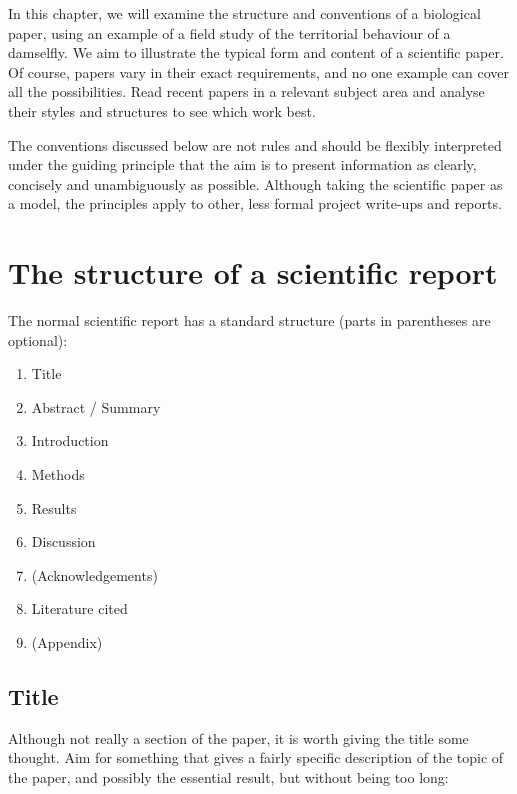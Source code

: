 \documentclass[
]{book}
\providecommand{\tightlist}{%
  \setlength{\itemsep}{0pt}\setlength{\parskip}{0pt}}
\begin{document}
In this chapter, we will examine the structure and conventions of a biological paper, using an example of a field study of the territorial behaviour of a damselfly. We aim to illustrate the typical form and content of a scientific paper. Of course, papers vary in their exact requirements, and no one example can cover all the possibilities. Read recent papers in a relevant subject area and analyse their styles and structures to see which work best.

The conventions discussed below are not rules and should be flexibly interpreted under the guiding principle that the aim is to present information as clearly, concisely and unambiguously as possible. Although taking the scientific paper as a model, the principles apply to other, less formal project write-ups and reports.

\hypertarget{the-structure-of-a-scientific-report}{%
\section{The structure of a scientific report}\label{the-structure-of-a-scientific-report}}

The normal scientific report has a standard structure (parts in parentheses are optional):

\begin{enumerate}
\def\labelenumi{\arabic{enumi}.}
\tightlist
\item
  Title
\item
  Abstract / Summary
\item
  Introduction
\item
  Methods
\item
  Results
\item
  Discussion
\item
  (Acknowledgements)
\item
  Literature cited
\item
  (Appendix)
\end{enumerate}

\hypertarget{title}{%
\subsection{Title}\label{title}}

Although not really a section of the paper, it is worth giving the title some thought. Aim for something that gives a fairly specific description of the topic of the paper, and possibly the essential result, but without being too long:
\end{document}
